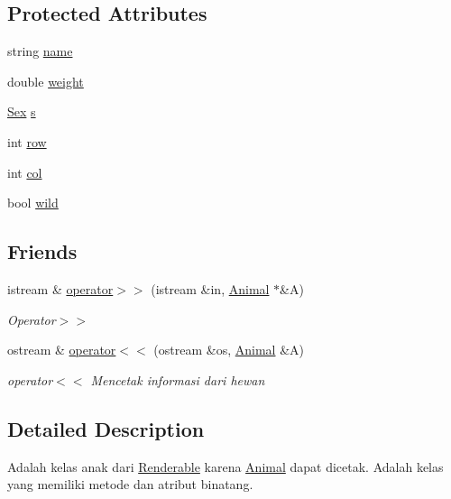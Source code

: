 \subsection*{Protected Attributes}
\begin{DoxyCompactItemize}
\item 
string \hyperlink{classAnimal_a9cf3bfd9070daec7b3bbc87cbd958f35}{name}
\item 
double \hyperlink{classAnimal_a65e900977918b50f9e5ff534dc1e8c01}{weight}
\item 
\hyperlink{sex_8h_a2633cb393c68bb2ee8080db58fb7ba93}{Sex} \hyperlink{classAnimal_a69cdeeac01d5b83eb441aacb5be935f1}{s}
\item 
int \hyperlink{classAnimal_a3eabc10dd98963d59485be78dc49fd86}{row}
\item 
int \hyperlink{classAnimal_a31aa34abac8c22b898aef97ca63f2630}{col}
\item 
bool \hyperlink{classAnimal_a6228996b6df852e6db2776c07c084afe}{wild}
\end{DoxyCompactItemize}
\subsection*{Friends}
\begin{DoxyCompactItemize}
\item 
istream \& \hyperlink{classAnimal_ae1c2dc52641f7001abeabd267e1a7dc9}{operator$>$$>$} (istream \&in, \hyperlink{classAnimal}{Animal} $\ast$\&A)
\begin{DoxyCompactList}\small\item\em Operator$>$$>$ \end{DoxyCompactList}\item 
ostream \& \hyperlink{classAnimal_a4d6786d5c8d30ed0c8047321ab47b5ff}{operator$<$$<$} (ostream \&os, \hyperlink{classAnimal}{Animal} \&A)
\begin{DoxyCompactList}\small\item\em operator$<$$<$ Mencetak informasi dari hewan \end{DoxyCompactList}\end{DoxyCompactItemize}


\subsection{Detailed Description}
Adalah kelas anak dari \hyperlink{classRenderable}{Renderable} karena \hyperlink{classAnimal}{Animal} dapat dicetak. Adalah kelas yang memiliki metode dan atribut binatang. 


